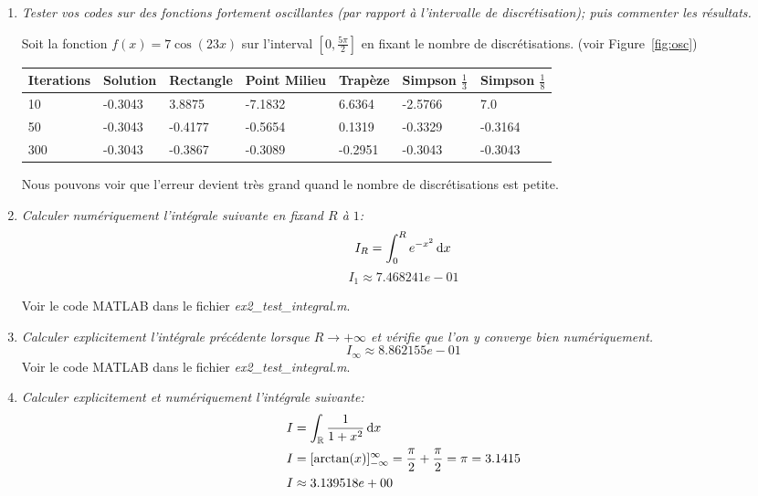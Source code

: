 \documentclass[a4paper,10pt]{article}
\begin{document}
\begin{enumerate}
    \item \emph{Tester vos codes sur des fonctions fortement oscillantes (par rapport à
    l'intervalle de discrétisation); puis commenter les résultats.}

    Soit la fonction $f(x) = 7\cos(23x)$ sur l'interval $[0, \frac{5 \pi}{2}]$
    en fixant le nombre de discrétisations. (voir Figure~\ref{fig:osc})

{
\renewcommand{\arraystretch}{1.2}
\begin{center}
\begin{tabular}{|l|l|l|l|l|l|l|}\hline

Iterations & Solution & Rectangle & Point Milieu & Trapèze & Simpson $\frac{1}{3}$ & Simpson $\frac{1}{8}$\\\hline
10         & -0.3043  & 3.8875    & -7.1832      & 6.6364  & -2.5766              & 7.0 \\\hline
50         & -0.3043  & -0.4177   & -0.5654      & 0.1319  & -0.3329              & -0.3164 \\\hline
300        & -0.3043  & -0.3867   & -0.3089      & -0.2951 & -0.3043              & -0.3043 \\\hline

\end{tabular}
\end{center}
}

    Nous pouvons voir que l'erreur devient très grand quand le nombre de
    discrétisations est petite.

    \item \emph{Calculer numériquement l'intégrale suivante en fixand $R$ à $1$:}
    \[
    I_R = \int_0^R e^{-x^2} \,\mathrm{d} x
    \]
    \[
    I_1 \approx 7.468241e-01
    \]

    Voir le code MATLAB dans le fichier \emph{ex2\_test\_integral.m}.

    \item \emph{Calculer explicitement l'intégrale précédente lorsque $R \to +\infty$
    et vérifie que l'on y converge bien numériquement.}
    \[
    I_{\infty} \approx 8.862155e-01
    \]
    Voir le code MATLAB dans le fichier \emph{ex2\_test\_integral.m}.

    \item \emph{Calculer explicitement et numériquement l'intégrale suivante:}
\begin{align*}
    I & = \int_{\mathbb{R}} \frac{1}{1 + x^2} \,\mathrm{d} x \\
    I & = [\arctan(x)]_{-\infty}^{\infty} = \frac{\pi}{2} + \frac{\pi}{2} = \pi = 3.1415\\
    I & \approx 3.139518e+00
\end{align*}


\end{enumerate}
\end{document}
